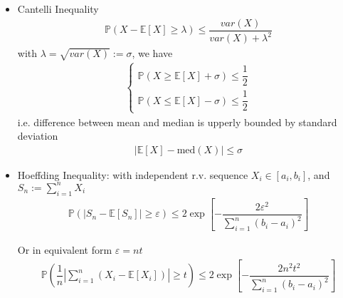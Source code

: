 \begin{itemize}
\begin{itemize}[topsep=2pt,itemsep=0pt]
    \end{itemize}
    \item Cantelli Inequality
    \begin{align}
        \mathbb{P}\left( X-\mathbb{E}\left[ X \right] \geq \lambda  \right) \leq \dfrac{var(X)}{var(X)+\lambda ^2} 
    \end{align}
    with $ \lambda =\sqrt{var(X)}:=\sigma  $, we have
    \begin{align}
        \begin{cases}
            \mathbb{P}\left( X\geq \mathbb{E}\left[ X \right] + \sigma \right) \leq \dfrac{1}{2}\\
            \mathbb{P}\left( X\leq \mathbb{E}\left[ X \right] - \sigma \right) \leq \dfrac{1}{2}
        \end{cases}
    \end{align}
    i.e. difference between mean and median is upperly bounded by standard deviation
    \begin{align}
        |\mathbb{E}\left[ X \right] - \mathrm{med}(X ) |\leq \sigma  
    \end{align}
    \item Hoeffding Inequality: with independent r.v. sequence $ X_i\in [a_i,b_i] $, and $ S_n:=\sum_{i=1}^nX_i $
    \begin{align}
        \mathbb{P}\left( \left\vert S_n-\mathbb{E}\left[ S_n \right]  \right\vert \geq \varepsilon   \right)  \leq 2\exp\left[ -\dfrac{2\varepsilon ^2}{\sum_{i=1}^n (b_i-a_i)^2} \right]
    \end{align}

    Or in equivalent form $ \varepsilon =nt $
    \begin{align*}
        \mathbb{P}\left( \dfrac{1}{n}\left\vert \sum_{i=1}^n\left(X_i-\mathbb{E}\left[ X_i \right] \right) \right\vert \geq t   \right)  \leq 2\exp\left[ -\dfrac{2n^2t ^2}{\sum_{i=1}^n (b_i-a_i)^2} \right]
    \end{align*}
    

\end{itemize}
